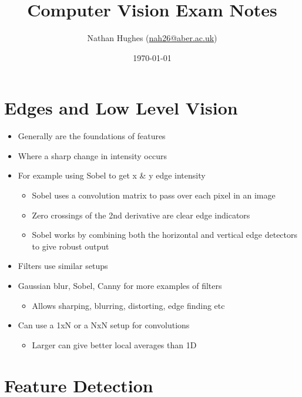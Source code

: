 \documentclass[a4paper]{article}
\author{Nathan Hughes (\href{mailto:nah31@aber.ac.uk}{nah26@aber.ac.uk})}
\date{\today}
\title{Computer Vision Exam Notes}
\begin{document}
\maketitle
\maketitle
\clearpage


\section{Edges and Low Level Vision}
\label{sec-1}

\begin{itemize}
\item Generally are the foundations of features
\item Where a sharp change in intensity occurs
\item For example using Sobel to get x \& y edge intensity
\begin{itemize}
\item Sobel uses a convolution matrix to pass over each pixel in an image
\item Zero crossings of the 2nd derivative are clear edge indicators
\item Sobel works by combining both the horizontal and vertical edge detectors to give robust output
\end{itemize}
\item Filters use similar setups
\item Gaussian blur, Sobel, Canny for more examples of filters
\begin{itemize}
\item Allows sharping, blurring, distorting, edge finding etc
\end{itemize}
\item Can use a 1xN or a NxN setup for convolutions
\begin{itemize}
\item Larger can give better local averages than 1D
\end{itemize}
\end{itemize}

\section{Feature Detection}
\label{sec-2}
\end{document}
